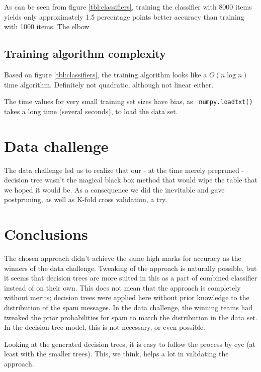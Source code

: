 \documentclass[a4paper,10pt]{article}
\begin{document}
As can be seen from figure \ref{tbl:classifiers}, training the
classifier with 8000 items yields only approximately 1.5 percentage
points better accuracy than training with 1000 items.  The elbow 
\subsection{Training algorithm complexity}

Based on figure \ref{tbl:classifiers}, the training algorithm looks like a
$O(n\log{n})$ time algorithm.  Definitely not quadratic, although not linear
either.

The time values for very small training set sizes have bias, as {\tt
  numpy.loadtxt()} takes a long time (several seconds), to load the data
set.

\section{Data challenge}


The data challenge led us to realize that our - at the time merely
prepruned - decision tree wasn't the magical black box method
that would wipe the table that we hoped it would be.
As a consequence we did the inevitable and gave postpruning,
as well as K-fold cross validation, a try.


\section{Conclusions}

The chosen approach didn't achieve the same high marks for accuracy as
the winners of the data challenge.  Tweaking of the approach is
naturally possible, but it seems that decision trees are more suited in
this as a part of combined classifier instead of on their own.  This
does not mean that the approach is completely without merits; decision
trees were applied here without prior knowledge to the distribution of
the spam messages.  In the data challenge, the winning teams had tweaked
the prior probabilities for spam to match the distribution in the data
set.  In the decision tree model, this is not necessary, or even
possible.

Looking at the generated decision trees, it is easy to follow the
process by eye (at least with the smaller trees).  This, we think, helps
a lot in validating the approach.
\end{document}
